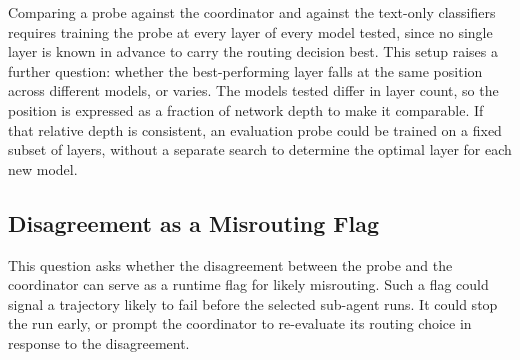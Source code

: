 \label{rq:rq3}


\noindent Comparing a probe against the coordinator and against the text-only classifiers requires training the probe at every layer of every model tested, since no single layer is known in advance to carry the routing decision best. This setup raises a further question: whether the best-performing layer falls at the same position across different models, or varies. The models tested differ in layer count, so the position is expressed as a fraction of network depth to make it comparable. If that relative depth is consistent, an evaluation probe could be trained on a fixed subset of layers, without a separate search to determine the optimal layer for each new model.

\subsection{Disagreement as a Misrouting Flag}
\label{subsec:rq4-derivation}

\label{rq:rq4}


\noindent This question asks whether the disagreement between the probe and the coordinator can serve as a runtime flag for likely misrouting. Such a flag could signal a trajectory likely to fail before the selected sub-agent runs. It could stop the run early, or prompt the coordinator to re-evaluate its routing choice in response to the disagreement.

